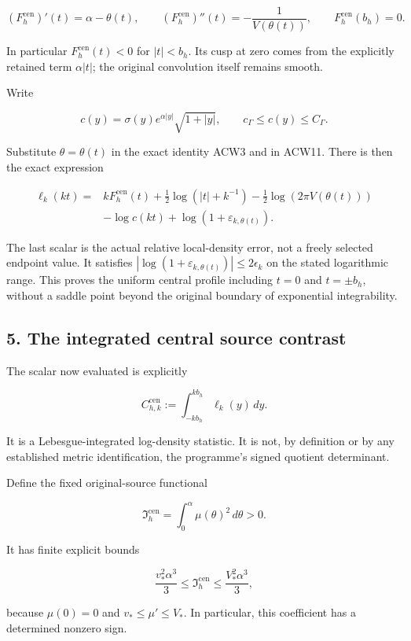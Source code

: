 \[
(F_h^{\mathrm{cen}})'(t)=\alpha-\theta(t),
\qquad
(F_h^{\mathrm{cen}})''(t)=-\frac1{V(\theta(t))},
\qquad F_h^{\mathrm{cen}}(b_h)=0.
\]

In particular \(F_h^{\mathrm{cen}}(t)<0\) for \(|t|<b_h\). Its cusp at zero comes from the explicitly retained term \(\alpha|t|\); the original convolution itself remains smooth.

Write

\[
c(y)=\sigma(y)e^{\alpha|y|}\sqrt{1+|y|},
\qquad c_\Gamma\le c(y)\le C_\Gamma.
\]

Substitute \(\theta=\theta(t)\) in the exact identity ACW3 and in ACW11. There is then the exact expression

\[
\boxed{
\begin{aligned}
\ell_k(kt)={}&kF_h^{\mathrm{cen}}(t)
+\tfrac12\log(|t|+k^{-1})
-\tfrac12\log(2\pi V(\theta(t)))\\
&-\log c(kt)+\log(1+\varepsilon_{k,\theta(t)}).
\end{aligned}}
\tag{ACW13}
\]

The last scalar is the actual relative local-density error, not a freely selected endpoint value. It satisfies
\(|\log(1+\varepsilon_{k,\theta(t)})|\le2\epsilon_k\) on the stated logarithmic range. This proves the uniform central profile including \(t=0\) and \(t=\pm b_h\), without a saddle point beyond the original boundary of exponential integrability.

\subsection{5. The integrated central source contrast}\label{the-integrated-central-source-contrast}

The scalar now evaluated is explicitly

\[
C_{h,k}^{\mathrm{cen}}:=
\int_{-kb_h}^{kb_h}\ell_k(y)\,dy.
\]

It is a Lebesgue-integrated log-density statistic. It is not, by definition or by any established metric identification, the programme's signed quotient determinant.

Define the fixed original-source functional

\[
\mathfrak I_h^{\mathrm{cen}}
=\int_0^\alpha\mu(\theta)^2\,d\theta>0.
\tag{ACW14}
\]

It has finite explicit bounds

\[
\frac{v_*^2\alpha^3}{3}\le\mathfrak I_h^{\mathrm{cen}}
\le\frac{V_*^2\alpha^3}{3},
\]

because \(\mu(0)=0\) and \(v_*\le\mu'\le V_*\). In particular, this coefficient has a determined nonzero sign.

